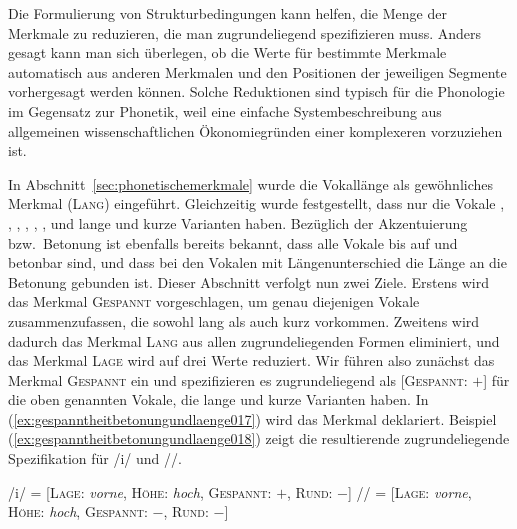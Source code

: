 Die Formulierung von Strukturbedingungen kann helfen, die Menge der Merkmale zu reduzieren, die man zugrundeliegend spezifizieren muss.
Anders gesagt kann man sich überlegen, ob die Werte für bestimmte Merkmale automatisch aus anderen Merkmalen und den Positionen der jeweiligen Segmente vorhergesagt werden können.
Solche Reduktionen sind typisch für die Phonologie im Gegensatz zur Phonetik, weil eine einfache Systembeschreibung aus allgemeinen wissenschaftlichen Ökonomiegründen einer komplexeren vorzuziehen ist.

In Abschnitt~\ref{sec:phonetischemerkmale} wurde die Vokallänge als gewöhnliches Merkmal (\textsc{Lang}) eingeführt.
Gleichzeitig wurde festgestellt, dass nur die Vokale \textipa{[i]}, \textipa{[y]}, \textipa{[u]}, \textipa{[e]}, \textipa{[\o]}, \textipa{[E]}, \textipa{[o]} und \textipa{[a]} lange und kurze Varianten haben.
Bezüglich der Akzentuierung bzw.\ Betonung ist ebenfalls bereits bekannt, dass alle Vokale bis auf \textipa{[@]} und \textipa{[5]} betonbar sind, und dass bei den Vokalen mit Längenunterschied die Länge an die Betonung gebunden ist.
Dieser Abschnitt verfolgt nun zwei Ziele.
Erstens wird das Merkmal \textsc{Gespannt} vorgeschlagen, um genau diejenigen Vokale zusammenzufassen, die sowohl lang als auch kurz vorkommen.
Zweitens wird dadurch das Merkmal \textsc{Lang} aus allen zugrundeliegenden Formen eliminiert, und das Merkmal \textsc{Lage} wird auf drei Werte reduziert.
Wir führen also zunächst das Merkmal \textsc{Gespannt} ein und spezifizieren es zugrundeliegend als [\textsc{Gespannt}: $+$] für die oben genannten Vokale, die lange und kurze Varianten haben.
In (\ref{ex:gespanntheitbetonungundlaenge017}) wird das Merkmal deklariert.
Beispiel (\ref{ex:gespanntheitbetonungundlaenge018}) zeigt die resultierende zugrundeliegende Spezifikation für /i/ und //.

\begin{exe}
  \ex\label{ex:gespanntheitbetonungundlaenge018}
  \begin{xlist}
    \ex /i/ = [\textsc{Lage}: \textit{vorne}, \textsc{Höhe}: \textit{hoch}, \textsc{Gespannt}: $+$, \textsc{Rund}: $-$]
    \ex // = [\textsc{Lage}: \textit{vorne}, \textsc{Höhe}: \textit{hoch}, \textsc{Gespannt}: $-$, \textsc{Rund}: $-$]
  \end{xlist}
\end{exe}

